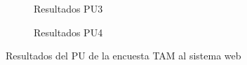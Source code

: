 \begin{figure}[H]
\begin{subfigure}[b]{0.4\textwidth}
        \caption{Resultados PU3}
    \end{subfigure}%
    \hfill
    \begin{subfigure}[b]{0.4\textwidth}
        \caption{Resultados PU4}
    \end{subfigure}%
    \caption{Resultados del PU de la encuesta TAM al sistema web}
    \label{fig:TAM-w-PU-Result}
\end{figure}

